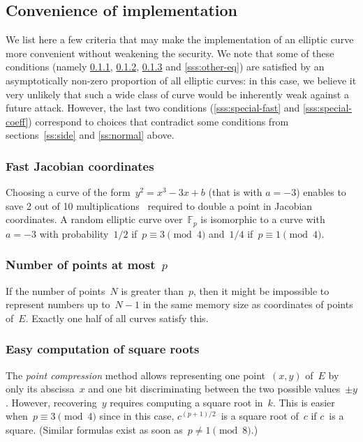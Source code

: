 \documentclass[twocolumn,letterpaper,10pt]{article}
\def\F{\mathbb{F}}
\begin{document}
\subsection{Convenience of implementation}
\label{ss:convenience}

We list here a few criteria that
may make the implementation of
an elliptic curve more convenient
without weakening the security.
We note that some of these conditions
(namely \ref{sss:a=-3}, \ref{sss:few-points},
\ref{sss:easy-sqrt} and \ref{sss:other-eq}) are satisfied
by an asymptotically non-zero proportion of all elliptic curves:
in this case, we believe it very unlikely
that such a wide class of curve would be inherently weak
against a future attack.
However, the last two conditions (\ref{sss:special-fast} and
\ref{sss:special-coeff}) correspond to choices that
contradict some conditions from sections~\ref{ss:side}
and \ref{ss:normal} above.

\subsubsection{Fast Jacobian coordinates}
\label{sss:a=-3}

Choosing a curve of the form~$y^2 = x^3 - 3 x + b$ (that is with $a=-3$)
enables to save 2 out of 10 multiplications~\cite{ieeep1363}
required to double a point in Jacobian coordinates.
A random elliptic curve over~$\F_p$
is isomorphic to a curve with~$a = -3$
with probability~$1/2$ if~$p ≡ 3 \pmod{4}$ and~$1/4$ if~$p ≡ 1 \pmod{4}$.

\subsubsection{Number of points at most~\texorpdfstring{$p$}{p}}
\label{sss:few-points}

If the number of points~$N$ is greater than~$p$,
then it might be impossible to represent numbers up to~$N-1$
in the same memory size as coordinates of points of~$E$.
Exactly one half of all curves satisfy this.

\subsubsection{Easy computation of square roots}
\label{sss:easy-sqrt}

The \emph{point compression} method allows representing
one point~$(x,y)$ of~$E$ by only its abscissa~$x$ and
one bit discriminating between the two possible values~$±y$.
However, recovering~$y$ requires computing a square root in~$k$.
This is easier when~$p ≡ 3 \pmod{4}$ since
in this case, $c^{(p+1)/2}$~is a square root of~$c$ if $c$~is a square.
(Similar formulas exist as soon as~$p \neq 1 \pmod{8}$.)
\end{document}
